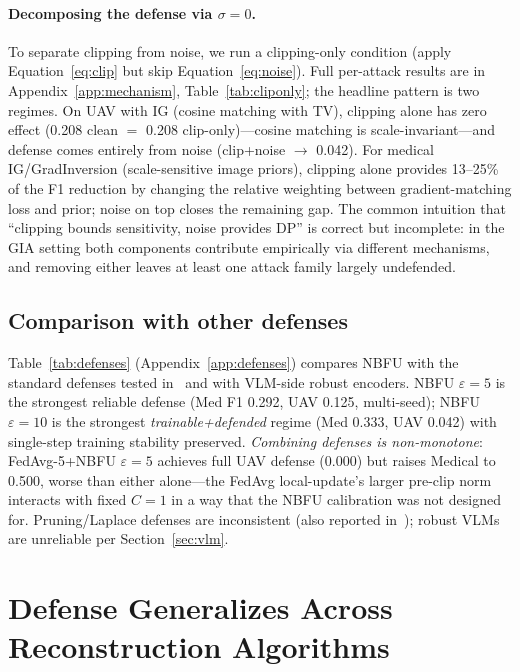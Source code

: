 \documentclass[11pt]{article}
\begin{document}
\paragraph{Decomposing the defense via $\sigma{=}0$.}
To separate clipping from noise, we run a clipping-only condition (apply Equation~\ref{eq:clip} but skip Equation~\ref{eq:noise}). Full per-attack results are in Appendix~\ref{app:mechanism}, Table~\ref{tab:cliponly}; the headline pattern is two regimes. On UAV with IG (cosine matching with TV), clipping alone has zero effect (0.208 clean $=$ 0.208 clip-only)---cosine matching is scale-invariant---and defense comes entirely from noise (clip+noise $\to$ 0.042). For medical IG/GradInversion (scale-sensitive image priors), clipping alone provides 13--25\% of the F1 reduction by changing the relative weighting between gradient-matching loss and prior; noise on top closes the remaining gap. The common intuition that ``clipping bounds sensitivity, noise provides DP'' is correct but incomplete: in the GIA setting both components contribute empirically via different mechanisms, and removing either leaves at least one attack family largely undefended.

\subsection{Comparison with other defenses}
\label{sec:defenses-comparison}
Table~\ref{tab:defenses} (Appendix~\ref{app:defenses}) compares NBFU with the standard defenses tested in~\citet{geminio2024} and with VLM-side robust encoders. NBFU $\varepsilon{=}5$ is the strongest reliable defense (Med F1 0.292, UAV 0.125, multi-seed); NBFU $\varepsilon{=}10$ is the strongest \emph{trainable+defended} regime (Med 0.333, UAV 0.042) with single-step training stability preserved. \emph{Combining defenses is non-monotone}: FedAvg-5+NBFU $\varepsilon{=}5$ achieves full UAV defense (0.000) but raises Medical to 0.500, worse than either alone---the FedAvg local-update's larger pre-clip norm interacts with fixed $C{=}1$ in a way that the NBFU calibration was not designed for. Pruning/Laplace defenses are inconsistent (also reported in~\citet{geminio2024}); robust VLMs are unreliable per Section~\ref{sec:vlm}.


\section{Defense Generalizes Across Reconstruction Algorithms}
\label{sec:generalize}
\end{document}
